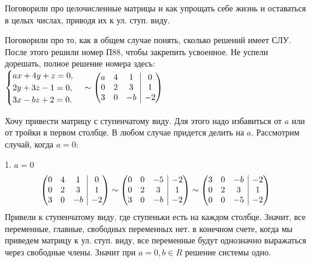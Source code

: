\documentclass[10pt, a4paper]{extarticle}
\makeatletter
\theoremstyle{definition}
\newenvironment{amatrix}[2]{%
    \left(\begin{array}{@{}*{#1}{c}|*{#2}{c}@{}}
}{%
    \end{array}\right)
}
\makeatother
\begin{document}
Поговорили про целочисленные матрицы и как упрощать себе жизнь и оставаться в целых числах, приводя их к ул. ступ. виду. 

Поговорили про то, как в общем случае понять, сколько решений имеет СЛУ. После этого решили номер П88, чтобы закрепить усвоенное. Не успели дорешать, полное решение номера здесь:
$\begin{cases}
    ax + 4y + z = 0,\\
    2y + 3z - 1 = 0,\\
    3x - bz + 2 = 0.
\end{cases}
\sim 
\begin{amatrix}{3}{1}
a & 4 & 1 & 0\\
0 & 2 & 3 & 1 \\
3 & 0 & -b & -2 
\end{amatrix}
$

Хочу привести матрицу с ступенчатому виду. Для этого надо избавиться от $a$ или от тройки в первом столбце. В любом случае придется делить на $a$. Рассмотрим случай, когда $a=0$:

1. $a=0$
\[
\begin{amatrix}{3}{1}
0 & 4 & 1 & 0\\
0 & 2 & 3 & 1 \\
3 & 0 & -b & -2 
\end{amatrix} \sim
\begin{amatrix}{3}{1}
0 & 0 & -5 & -2\\
0 & 2 & 3 & 1 \\
3 & 0 & -b & -2 
\end{amatrix} \sim
\begin{amatrix}{3}{1}
3 & 0 & -b & -2 \\
0 & 2 & 3 & 1 \\
0 & 0 & -5 & -2\\
\end{amatrix}
\]
Привели к  ступенчатому виду, где ступеньки есть на каждом столбце. Значит, все переменные, главные, свободных переменных нет. в конечном счете, когда мы приведем матрицу к ул. ступ. виду, все переменные будут однозначно выражаться через свободные члены. Значит при $a=0, b\in R$ решение системы одно.
\end{document}
